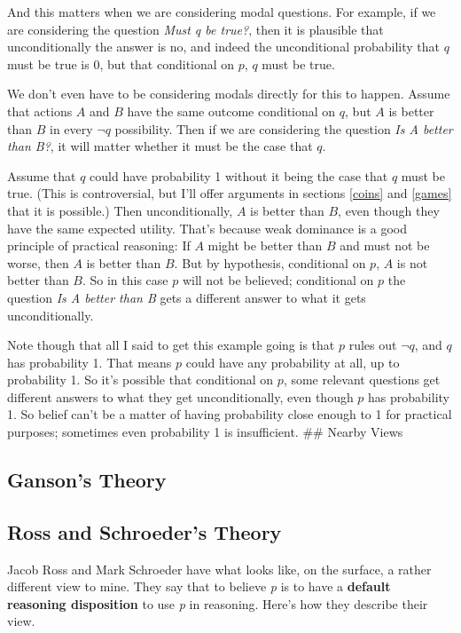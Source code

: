 \documentclass[11pt,]{book}
\begin{document}
And this matters when we are considering modal questions. For example, if we are considering the question \emph{Must q be true?}, then it is plausible that unconditionally the answer is no, and indeed the unconditional probability that \(q\) must be true is 0, but that conditional on \(p\), \(q\) must be true.

We don't even have to be considering modals directly for this to happen. Assume that actions \(A\) and \(B\) have the same outcome conditional on \(q\), but \(A\) is better than \(B\) in every \(\neg q\) possibility. Then if we are considering the question \emph{Is A better than B?}, it will matter whether it must be the case that \(q\).

Assume that \(q\) could have probability 1 without it being the case that \(q\) must be true. (This is controversial, but I'll offer arguments in sections \ref{coins} and \ref{games} that it is possible.) Then unconditionally, \(A\) is better than \(B\), even though they have the same expected utility. That's because weak dominance is a good principle of practical reasoning: If \(A\) might be better than \(B\) and must not be worse, then \(A\) is better than \(B\). But by hypothesis, conditional on \(p\), \(A\) is not better than \(B\). So in this case \(p\) will not be believed; conditional on \(p\) the question \emph{Is A better than B} gets a different answer to what it gets unconditionally.

Note though that all I said to get this example going is that \(p\) rules out \(\neg q\), and \(q\) has probability 1. That means \(p\) could have any probability at all, up to probability 1. So it's possible that conditional on \(p\), some relevant questions get different answers to what they get unconditionally, even though \(p\) has probability 1. So belief can't be a matter of having probability close enough to 1 for practical purposes; sometimes even probability 1 is insufficient.
\#\# Nearby Views

\hypertarget{ganson}{%
\subsection{Ganson's Theory}\label{ganson}}

\hypertarget{usc}{%
\subsection{Ross and Schroeder's Theory}\label{usc}}

Jacob Ross and Mark Schroeder \citeyearpar{SchroederRoss2012} have what looks like, on the surface, a rather different view to mine. They say that to believe \emph{p} is to have a \textbf{default reasoning disposition} to use \emph{p} in reasoning. Here's how they describe their view.
\end{document}
